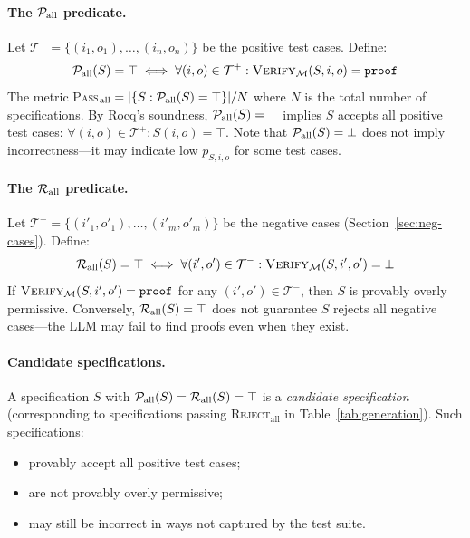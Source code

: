 \paragraph{The $\mathcal{P}_{\text{all}}$ predicate.}
Let $\mathcal{T}^{+} = \{(i_1, o_1), \ldots, (i_n, o_n)\}$ be the positive test cases. Define:
\begin{equation}
\mathcal{P}_{\text{all}}(S) = \top \iff \forall (i, o) \in \mathcal{T}^{+} : \textsc{Verify}_{\mathcal{M}}(S, i, o) = \texttt{proof}
\end{equation}
The metric \textsc{Pass}$_{\text{all}} = |\{S : \mathcal{P}_{\text{all}}(S) = \top\}| / N$ where $N$ is the total number of specifications. By Rocq's soundness, $\mathcal{P}_{\text{all}}(S) = \top$ implies $S$ accepts all positive test cases: $\forall (i, o) \in \mathcal{T}^{+} : S(i, o) = \top$. Note that $\mathcal{P}_{\text{all}}(S) = \bot$ does not imply incorrectness---it may indicate low $p_{S,i,o}$ for some test cases.

\paragraph{The $\mathcal{R}_{\text{all}}$ predicate.}
Let $\mathcal{T}^{-} = \{(i'_1, o'_1), \ldots, (i'_m, o'_m)\}$ be the negative cases (Section~\ref{sec:neg-cases}). Define:
\begin{equation}
\mathcal{R}_{\text{all}}(S) = \top \iff \forall (i', o') \in \mathcal{T}^{-} : \textsc{Verify}_{\mathcal{M}}(S, i', o') = \bot
\end{equation}
If $\textsc{Verify}_{\mathcal{M}}(S, i', o') = \texttt{proof}$ for any $(i', o') \in \mathcal{T}^{-}$, then $S$ is provably overly permissive. Conversely, $\mathcal{R}_{\text{all}}(S) = \top$ does not guarantee $S$ rejects all negative cases---the LLM may fail to find proofs even when they exist.

\paragraph{Candidate specifications.}
A specification $S$ with $\mathcal{P}_{\text{all}}(S) = \mathcal{R}_{\text{all}}(S) = \top$ is a \emph{candidate specification} (corresponding to specifications passing \textsc{Reject}$_\text{all}$ in Table~\ref{tab:generation}). Such specifications:
\begin{itemize}[leftmargin=1.5em, itemsep=2pt, topsep=2pt]
    \item provably accept all positive test cases;
    \item are not provably overly permissive;
    \item may still be incorrect in ways not captured by the test suite.
\end{itemize}

